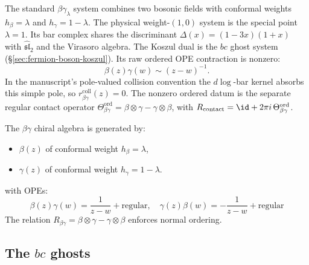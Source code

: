 The standard $\beta\gamma_\lambda$ system combines two bosonic
fields with conformal weights
$h_\beta=\lambda$ and $h_\gamma=1-\lambda$. The physical
weight-$(1,0)$ system is the special point $\lambda=1$. Its bar
complex shares the discriminant $\Delta(x) = (1-3x)(1+x)$ with
$\widehat{\mathfrak{sl}}_2$ and the Virasoro algebra. The
Koszul dual is the $bc$ ghost system (\S\ref{sec:fermion-boson-koszul}).
Its raw ordered OPE contraction is nonzero:
\[
\beta(z)\gamma(w)\sim (z-w)^{-1}.
\]
In the manuscript's pole-valued collision convention the \(d\log\)-bar
kernel absorbs this simple pole, so
\(r^{\mathrm{coll}}_{\beta\gamma}(z)=0\). The nonzero ordered datum is
the separate regular contact operator
$\Theta_{\beta\gamma}^{\mathrm{ord}}
=\beta\otimes\gamma-\gamma\otimes\beta$, with
$R_{\mathrm{contact}}=\id+2\pi i\,\Theta_{\beta\gamma}^{\mathrm{ord}}$.

\begin{definition}
The $\beta\gamma$ chiral algebra is generated by:
\begin{itemize}
\item $\beta(z)$ of conformal weight $h_\beta = \lambda$,
\item $\gamma(z)$ of conformal weight $h_\gamma = 1-\lambda$.
\end{itemize}
with OPEs:
\[
\beta(z)\gamma(w) = \frac{1}{z-w} + \text{regular}, \quad
\gamma(z)\beta(w) = -\frac{1}{z-w} + \text{regular}
\]
The relation $R_{\beta\gamma} = \beta \otimes \gamma - \gamma \otimes \beta$ enforces normal ordering.
\end{definition}


\subsection{\texorpdfstring{The $bc$ ghosts}{The bc ghosts}}

